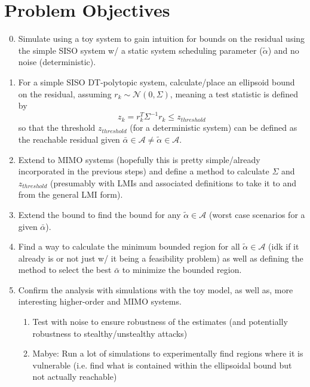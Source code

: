 \documentclass[]{article}
\begin{document}
\section{Problem Objectives}
\begin{enumerate}
	\setcounter{enumi}{-1} %
	\item Simulate using a toy system to gain intuition for bounds on the residual using the simple SISO system w/ a static system scheduling parameter ($\tilde{\alpha}$) and no noise (deterministic).
	\item For a simple SISO DT-polytopic system, calculate/place an ellipsoid bound on the residual, assuming $r_k \sim \mathcal{N}(0,\Sigma)$, meaning a test statistic is defined by
	$$z_k = r_k^T \Sigma^{-1} r_k \leq z_{threshold}$$
	so that the threshold $z_{threshold}$ (for a deterministic system) can be defined as the reachable residual given $\bar{\alpha} \in \mathcal{A} \neq \tilde{\alpha} \in \mathcal{A}$.
	\item Extend to MIMO systems (hopefully this is pretty simple/already incorporated in the previous steps) and define a method to calculate $\Sigma$ and $z_{threshold}$ (presumably with LMIs and associated definitions to take it to and from the general LMI form).
	\item Extend the bound to find the bound for any $\tilde{\alpha}\in \mathcal{A}$ (worst case scenarios for a given $\bar{\alpha}$).
	\item Find a way to calculate the minimum bounded region for all $\tilde{\alpha} \in \mathcal{A}$ (idk if it already is or not just w/ it being a feasibility problem) as well as defining the method to select the best $\bar{\alpha}$ to minimize the bounded region.
	\item Confirm the analysis with simulations with the toy model, as well as, more interesting higher-order and MIMO systems.
	\begin{enumerate}
		\item Test with noise to ensure robustness of the estimates (and potentially robustness to stealthy/unstealthy attacks)
		\item Mabye: Run a lot of simulations to experimentally find regions where it is vulnerable (i.e. find what is contained within the ellipsoidal bound but not actually reachable)
	\end{enumerate}
\end{enumerate}
\end{document}
